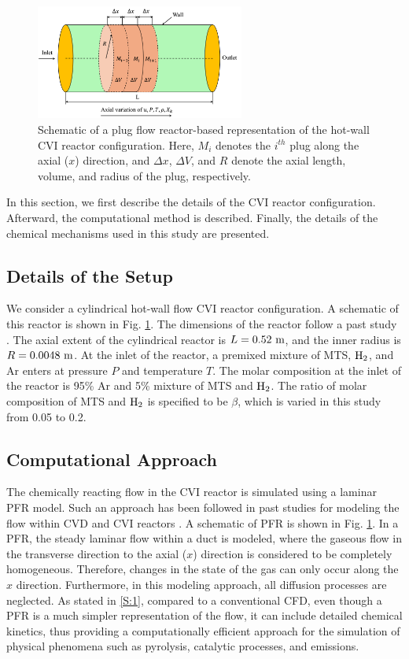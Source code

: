 \documentclass[final, letterpaper, square, comma, numbers, sort&compress]{elsarticle}
\begin{document}
\begin{figure}[t]
\centering\includegraphics[width=0.61\textwidth]{PFR-schematic.png}
\caption{Schematic of a plug flow reactor-based representation of the hot-wall CVI reactor configuration. Here, $M_i$ denotes the $i^{th}$ plug along the axial ($x$) direction, and $\Delta x$, $\Delta V$, and $R$ denote the axial length, volume, and radius of the plug, respectively.}
\label{PFR-schematic}
\end{figure}

In this section, we first describe the details of the CVI reactor configuration. Afterward, the computational method is described. Finally, the details of the chemical mechanisms used in this study are presented.

\subsection{Details of the Setup}
\label{S:2.1}
We consider a cylindrical hot-wall flow CVI reactor configuration. A schematic of this reactor is shown in Fig. \ref{PFR-schematic}. The dimensions of the reactor follow a past study \cite{Dang2022}. The axial extent of the cylindrical reactor is $L = 0.52 \rm\ m$, and the inner radius is $R = 0.0048 \rm\ m$. At the inlet of the reactor, a premixed mixture of MTS, $\rm H_2$, and Ar enters at pressure $P$ and temperature $T$. The molar composition at the inlet of the reactor is 95\% Ar and 5\% mixture of MTS and $\rm H_2$. The ratio of molar composition of MTS and $\rm H_2$ is specified to be $\beta$, which is varied in this study from 0.05 to 0.2.

\subsection{Computational Approach}
\label{S:2.2}
The chemically reacting flow in the CVI reactor is simulated using a laminar PFR model. Such an approach has been followed in past studies for modeling the flow within CVD and CVI reactors \cite{Dang2022,Roman1995,Bammidipati1996}. A schematic of PFR is shown in Fig. \ref{PFR-schematic}. In a PFR, the steady laminar flow within a duct is modeled, where the gaseous flow in the transverse direction to the axial ($x$) direction is considered to be completely homogeneous. Therefore, changes in the state of the gas can only occur along the $x$ direction. Furthermore, in this modeling approach, all diffusion processes are neglected. As stated in \ref{S:1}, compared to a conventional CFD, even though a PFR is a much simpler representation of the flow, it can include detailed chemical kinetics, thus providing a computationally efficient approach for the simulation of physical phenomena such as pyrolysis, catalytic processes, and emissions.
\end{document}
